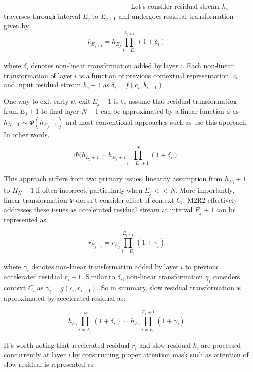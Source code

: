 
-------------------------------------------------------
Let's consider residual stream $h_i$ traverses through interval $E_j$ to $E_{j+1}$ and undergoes residual transformation given by 
\begin{equation}
h_{E_{j+1}} = h_{E_j} \prod_{i=E_j}^{E_{j+1}} \left( 1 + \delta_i \right)    
\end{equation}

where $\delta_i$ denotes non-linear transformation added by layer $i$. Each non-linear transformation of layer $i$ is a function of previous contextual representation, $c_i$ and input residual stream $h_i-1$ as
$\delta_i = f(c_i, h_{i-1})$ 

One way to exit early at exit $E_j+1$ is to assume that residual transformation from $E_j+1$ to final layer $N-1$ can be approximated by a linear function $\phi$ as $h_{N-1} \sim \Phi(h_{E_j+1})$ and most conventional approaches such as  use this approach. In other words, 

\begin{equation}
\Phi(h_{E_j+1} \sim h_{E_j+1} \prod_{i=E_j+1}^{N} \left( 1 + \delta_i \right)   
\end{equation}

This approach suffers from two primary issues, linearity assumption from $h_E_j+1$ to $H_N-1$ if often incorrect, particularly when $E_j << N$. More importantly, linear transformation $\Phi$ doesn't consider effect of context $C_i$. M2R2  effectively addresses these issues as accelerated residual stream at interval $E_j+1$ can be represented as 

\begin{equation}
r_{E_{j+1}} = r_{E_j} \prod_{i=E_j}^{E_{j+1}} \left( 1 + \gamma_i \right)    
\end{equation}

where $\gamma_i$ denotes non-linear transformation added by layer $i$ to previous accelerated residual $r_i-1$. Similar to $\delta_i$, non-linear transformation $\gamma_i$ considers context $C_i$ as 
$\gamma_i = g(c_i, r_{i-1})$. So in summary, slow residual transformation is approximated by accelerated residual as: 

\begin{equation}
h_{E_j} \prod_{i=E_j}^{N} \left( 1 + \delta_i \right) \sim h_{E_j} \prod_{i=E_j}^{E_j+1} \left( 1 + \gamma_i \right)
\end{equation}

It's worth noting that accelerated residual $r_i$ and slow residual $h_i$ are processed concurrently at layer $i$ by constructing proper attention mask such as attention of slow residual is represented as 


